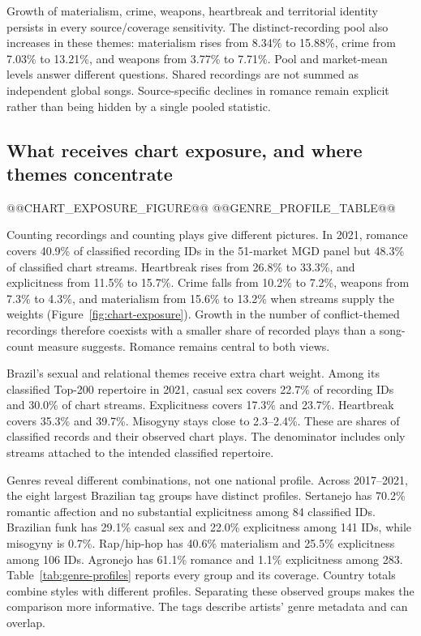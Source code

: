 \documentclass[10pt,a4paper,twocolumn]{article}
\begin{document}
Growth of materialism, crime, weapons, heartbreak and territorial identity persists in every source/coverage sensitivity. The distinct-recording pool also increases in these themes: materialism rises from 8.34\% to 15.88\%, crime from 7.03\% to 13.21\%, and weapons from 3.77\% to 7.71\%. Pool and market-mean levels answer different questions. Shared recordings are not summed as independent global songs. Source-specific declines in romance remain explicit rather than being hidden by a single pooled statistic.

\subsection{What receives chart exposure, and where themes concentrate}
@@CHART_EXPOSURE_FIGURE@@
@@GENRE_PROFILE_TABLE@@

Counting recordings and counting plays give different pictures. In 2021, romance covers 40.9\% of classified recording IDs in the 51-market MGD panel but 48.3\% of classified chart streams. Heartbreak rises from 26.8\% to 33.3\%, and explicitness from 11.5\% to 15.7\%. Crime falls from 10.2\% to 7.2\%, weapons from 7.3\% to 4.3\%, and materialism from 15.6\% to 13.2\% when streams supply the weights (Figure~\ref{fig:chart-exposure}). Growth in the number of conflict-themed recordings therefore coexists with a smaller share of recorded plays than a song-count measure suggests. Romance remains central to both views.

Brazil's sexual and relational themes receive extra chart weight. Among its classified Top-200 repertoire in 2021, casual sex covers 22.7\% of recording IDs and 30.0\% of chart streams. Explicitness covers 17.3\% and 23.7\%. Heartbreak covers 35.3\% and 39.7\%. Misogyny stays close to 2.3--2.4\%. These are shares of classified records and their observed chart plays. The denominator includes only streams attached to the intended classified repertoire.

Genres reveal different combinations, not one national profile. Across 2017--2021, the eight largest Brazilian tag groups have distinct profiles. Sertanejo has 70.2\% romantic affection and no substantial explicitness among 84 classified IDs. Brazilian funk has 29.1\% casual sex and 22.0\% explicitness among 141 IDs, while misogyny is 0.7\%. Rap/hip-hop has 40.6\% materialism and 25.5\% explicitness among 106 IDs. Agronejo has 61.1\% romance and 1.1\% explicitness among 283. Table~\ref{tab:genre-profiles} reports every group and its coverage. Country totals combine styles with different profiles. Separating these observed groups makes the comparison more informative. The tags describe artists' genre metadata and can overlap.
\end{document}
